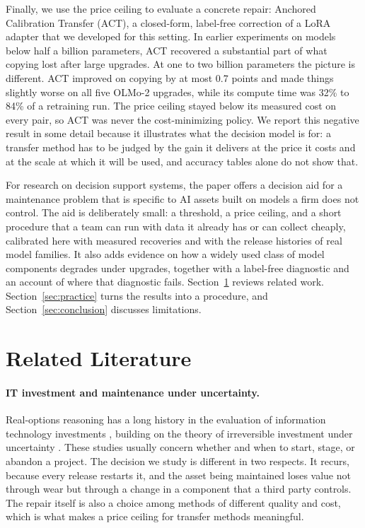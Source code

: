 \documentclass[preprint,12pt,authoryear]{elsarticle}
\begin{document}
Finally, we use the price ceiling to evaluate a concrete repair: Anchored Calibration Transfer (ACT), a closed-form, label-free correction of a LoRA adapter that we developed for this setting. In earlier experiments on models below half a billion parameters, ACT recovered a substantial part of what copying lost after large upgrades. At one to two billion parameters the picture is different. ACT improved on copying by at most 0.7 points and made things slightly worse on all five OLMo-2 upgrades, while its compute time was 32\% to 84\% of a retraining run. The price ceiling stayed below its measured cost on every pair, so ACT was never the cost-minimizing policy. We report this negative result in some detail because it illustrates what the decision model is for: a transfer method has to be judged by the gain it delivers at the price it costs and at the scale at which it will be used, and accuracy tables alone do not show that.

For research on decision support systems, the paper offers a decision aid for a maintenance problem that is specific to AI assets built on models a firm does not control. The aid is deliberately small: a threshold, a price ceiling, and a short procedure that a team can run with data it already has or can collect cheaply, calibrated here with measured recoveries and with the release histories of real model families. It also adds evidence on how a widely used class of model components degrades under upgrades, together with a label-free diagnostic and an account of where that diagnostic fails. Section~\ref{sec:lit} reviews related work. Section~\ref{sec:practice} turns the results into a procedure, and Section~\ref{sec:conclusion} discusses limitations.

\section{Related Literature}\label{sec:lit}

\paragraph{IT investment and maintenance under uncertainty.} Real-options reasoning has a long history in the evaluation of information technology investments \citep{benaroch1999case,benaroch2002managing}, building on the theory of irreversible investment under uncertainty \citep{mcdonald1986value,dixit1994investment}. These studies usually concern whether and when to start, stage, or abandon a project. The decision we study is different in two respects. It recurs, because every release restarts it, and the asset being maintained loses value not through wear but through a change in a component that a third party controls. The repair itself is also a choice among methods of different quality and cost, which is what makes a price ceiling for transfer methods meaningful.
\end{document}
